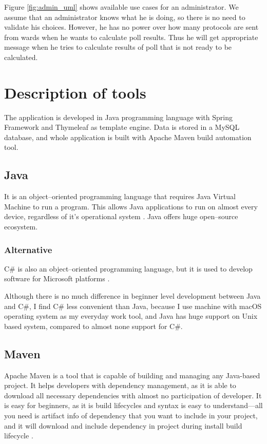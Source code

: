 \documentclass[a4paper,twoside,12pt]{book}
\begin{document}
    Figure \ref{fig:admin_uml} shows available use cases for an administrator. We assume that an administrator knows what he is doing, so there is no need to validate his choices.
    However, he has no power over how many protocols are sent from wards when he wants to calculate poll results. 
    Thus he will get appropriate message when he tries to calculate results of poll that is not ready to be calculated.

  \section{Description of tools}
    The application is developed in Java programming language with Spring Framework and Thymeleaf as template engine. 
    Data is stored in a MySQL database, and whole application is built with  Apache Maven build automation tool.

    \subsection{Java}
      It is an object--oriented programming language that requires Java Virtual Machine to run a program. 
      This allows Java applications to run on almost every device, regardless of it's operational system \cite{bib:horstmann2008core}.
      Java offers huge open--source ecosystem.

      \subsubsection{Alternative}
        C\# is also an object--oriented programming language, but it is used to develop software for Microsoft platforms \cite{bib:thai2003net}.

      Although there is no much difference in beginner level development between Java and C\#, I find C\# less convenient than Java,
      because I use machine with macOS operating system as my everyday work tool, and Java has huge support on Unix based system, compared to almost none support for C\#.

    \subsection{Maven}
      Apache Maven is a tool that is capable of building and managing any Java-based project. 
      It helps developers with dependency management, as it is able to download all necessary dependencies with almost no participation of developer.
      It is easy for beginners, as it is build lifecycles and syntax is easy to understand---all you need is artifact info of dependency that you want to include in your project, 
      and it will download and include dependency in project during install build lifecycle \cite{bib:maven}.
\end{document}
